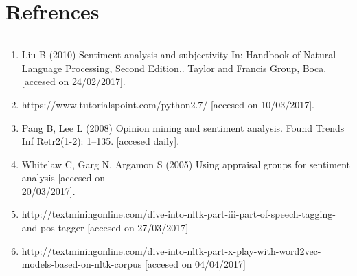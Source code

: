 \chapter{Refrences}\hrule
\label{Chapter:7}
\begin{enumerate}
	\item Liu B (2010) Sentiment analysis and subjectivity In: Handbook of Natural Language Processing, Second Edition.. Taylor and Francis Group, Boca.[accesed on 24/02/2017].
	\item https://www.tutorialspoint.com/python2.7/ [accesed on 10/03/2017].
	\item Pang B, Lee L (2008) Opinion mining and sentiment analysis. Found Trends Inf Retr2(1-2): 1–135. [accesed daily].
	\item Whitelaw C, Garg N, Argamon S (2005) Using appraisal groups for sentiment analysis  [accesed on \\20/03/2017].
	\item http://textminingonline.com/dive-into-nltk-part-iii-part-of-speech-tagging-and-pos-tagger [accesed on 27/03/2017]
	\item http://textminingonline.com/dive-into-nltk-part-x-play-with-word2vec-models-based-on-nltk-corpus [accesed on 04/04/2017] 

\end{enumerate}